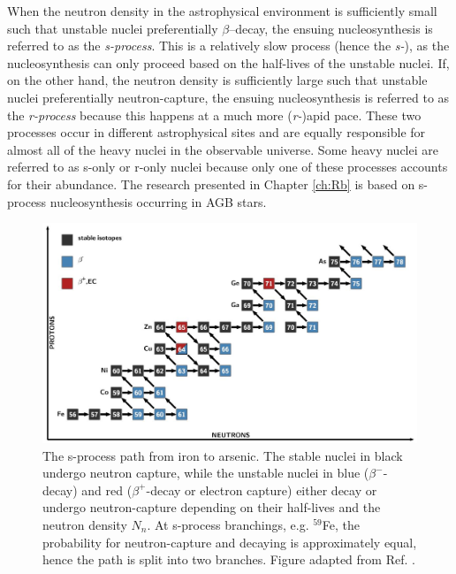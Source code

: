 When the neutron density in the astrophysical environment is sufficiently small such that unstable nuclei preferentially $\beta$--decay, the ensuing nucleosynthesis is referred to as the \emph{s-process}. This is a relatively slow process (hence the \emph{s-}), as the nucleosynthesis can only proceed based on the half-lives of the unstable nuclei. If, on the other hand, the neutron density is sufficiently large such that unstable nuclei preferentially neutron-capture, the ensuing nucleosynthesis is referred to as the \emph{r-process} because this happens at a much more (\emph{r-})apid pace. These two processes occur in different astrophysical sites and are equally responsible for almost all of the heavy nuclei in the observable universe. Some heavy nuclei are referred to as s-only or r-only nuclei because only one of these processes accounts for their abundance. The research presented in Chapter \ref{ch:Rb} is based on s-process nucleosynthesis occurring in AGB stars.


\begin{figure}[t]
\centering
\includegraphics[width=6.5in]{Chapter-1/figs/sProcess_path.jpg}
\caption{\label{fig:sProcess_path}The s-process path from iron to arsenic. The stable nuclei in black undergo neutron capture, while the unstable nuclei in blue ($\beta^{-}$-decay) and red ($\beta^{+}$-decay or electron capture) either decay or undergo neutron-capture depending on their half-lives and the neutron density $N_{n}$. At s-process branchings, e.g. $^{59}$Fe, the probability for neutron-capture and decaying is approximately equal, hence the path is split into two branches. Figure adapted from Ref. \cite{Reifarth2014}.}
\end{figure}

